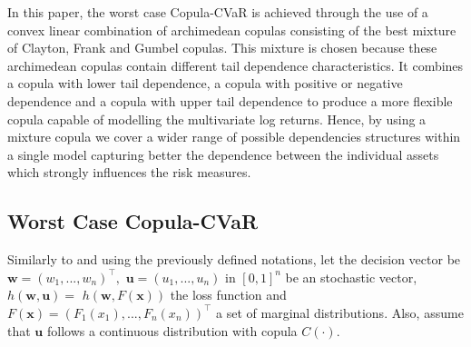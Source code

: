 \documentclass[a4paper,12pt]{report}
\begin{document}
In this paper, the worst case Copula-CVaR is achieved through the use of a
convex linear combination of archimedean copulas consisting of the best
mixture of Clayton, Frank and Gumbel copulas. This mixture is chosen because
these archimedean copulas contain different tail dependence characteristics.
It combines a copula with lower tail dependence, a copula with positive or
negative dependence and a copula with upper tail dependence to produce a
more flexible copula capable of modelling the multivariate log returns.
Hence, by using a mixture copula we cover a wider range of possible
dependencies structures within a single model capturing better the
dependence between the individual assets which strongly influences the risk
measures.

\vspace{0.6cm}

\subsection{Worst Case Copula-CVaR}

Similarly to \citet*{kakouris14} and using the previously defined notations,
let the decision vector be $\mathbf{w=}\left( w_{1},...,w_{n}\right) ^{\top
},$ $\mathbf{u}=\left( u_{1},...,u_{n}\right) $ in $[0,1]^{n}$ be an
stochastic vector, $h\left( \mathbf{w,u}\right) =$ $h\left( \mathbf{w,}%
F\left( \mathbf{x}\right) \right) $ the loss function and $F\left( \mathbf{x}%
\right) =\left( F_{1}\left( x_{1}\right) ,...,F_{n}\left( x_{n}\right)
\right) ^{\top }$ a set of marginal distributions. Also, assume that $\mathbf{u}$ follows a continuous
distribution with copula $C\left( \cdot \right) $.

\bigskip
\end{document}
